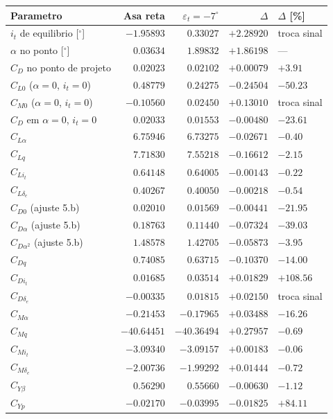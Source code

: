 \begin{tabular}{lrrrl}
\toprule
Parametro & Asa reta & $\varepsilon_t=-7^\circ$ & $\Delta$ & $\Delta$ [\%] \\
\midrule
$i_t$ de equilibrio [$^\circ$] & $-1.95893$ & $0.33027$ & $+2.28920$ & troca sinal \\
$\alpha$ no ponto [$^\circ$] & $0.03634$ & $1.89832$ & $+1.86198$ & --- \\
$C_D$ no ponto de projeto & $0.02023$ & $0.02102$ & $+0.00079$ & $+3.91$ \\
$C_{L0}$ ($\alpha=0$, $i_t=0$) & $0.48779$ & $0.24275$ & $-0.24504$ & $-50.23$ \\
$C_{M0}$ ($\alpha=0$, $i_t=0$) & $-0.10560$ & $0.02450$ & $+0.13010$ & troca sinal \\
$C_D$ em $\alpha=0$, $i_t=0$ & $0.02033$ & $0.01553$ & $-0.00480$ & $-23.61$ \\
$C_{L\alpha}$ & $6.75946$ & $6.73275$ & $-0.02671$ & $-0.40$ \\
$C_{Lq}$ & $7.71830$ & $7.55218$ & $-0.16612$ & $-2.15$ \\
$C_{Li_t}$ & $0.64148$ & $0.64005$ & $-0.00143$ & $-0.22$ \\
$C_{L\delta_e}$ & $0.40267$ & $0.40050$ & $-0.00218$ & $-0.54$ \\
$C_{D0}$ (ajuste 5.b) & $0.02010$ & $0.01569$ & $-0.00441$ & $-21.95$ \\
$C_{D\alpha}$ (ajuste 5.b) & $0.18763$ & $0.11440$ & $-0.07324$ & $-39.03$ \\
$C_{D\alpha^2}$ (ajuste 5.b) & $1.48578$ & $1.42705$ & $-0.05873$ & $-3.95$ \\
$C_{Dq}$ & $0.74085$ & $0.63715$ & $-0.10370$ & $-14.00$ \\
$C_{Di_t}$ & $0.01685$ & $0.03514$ & $+0.01829$ & $+108.56$ \\
$C_{D\delta_e}$ & $-0.00335$ & $0.01815$ & $+0.02150$ & troca sinal \\
$C_{M\alpha}$ & $-0.21453$ & $-0.17965$ & $+0.03488$ & $-16.26$ \\
$C_{Mq}$ & $-40.64451$ & $-40.36494$ & $+0.27957$ & $-0.69$ \\
$C_{Mi_t}$ & $-3.09340$ & $-3.09157$ & $+0.00183$ & $-0.06$ \\
$C_{M\delta_e}$ & $-2.00736$ & $-1.99292$ & $+0.01444$ & $-0.72$ \\
$C_{Y\beta}$ & $0.56290$ & $0.55660$ & $-0.00630$ & $-1.12$ \\
$C_{Yp}$ & $-0.02170$ & $-0.03995$ & $-0.01825$ & $+84.11$ \\

\end{tabular}

